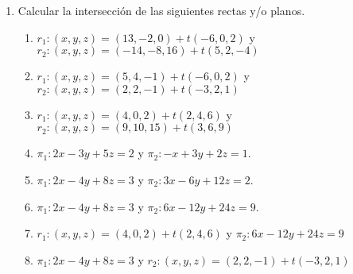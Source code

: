 \documentclass[a4paper]{article}
\newcommand{\exercise}{\item}
\begin{document}
\begin{enumerate}
\begin{enumerate} [label=(\alph*)]
		\item  Es paralelo al vector $(2,-1,4)$ y pasa por el punto $P(3,3,1)$.
		\item  Pasa por los puntos $P(4,0,5)$ y $Q(-1,-1,0)$.
		\item  Pasa por los puntos $A(0,1,1)$, $B(1,3,2)$, $C(0,2,-4)$ y $D(1,7,5)$.
		\item  Pasa por los puntos $P(3,-2,0)$ y $Q(1,-1,1)$ y es paralelo al vector $(1,2,2)$.
		\item  Pasa por los puntos $P(3,-2,0)$ y $Q(1,-1,1)$ y es paralelo al vector $(1,2,2)$.
		\item  Es paralelo al plano $\pi: 2x-3y+2z=6$ y pasa por el punto $P(2,1,0)$.
		\item  Es paralelo a las rectas $r_1: (x,y,z)=(1,4,0)+t(5,5,-3)$ y $r_2: (x,y,z)=(-10,2,7)+t(4,0,3)$ y contiene al punto $P(2,2,2)$.
		\item  Es perpendicular a la recta $r: (x,y,z)=(2,-9,7)+t(1,-1,1)$ y pasa por el punto $P(3,1,-3)$.
		\item  Contiene a la recta $r: (x,y,z)=(5,1,0)+t(1,-3,1)$.
		\item Es perpendicular a los planos $\pi_1: 2x-3y+5z=2$ y $\pi_2: -x+3y+2z=1$ e incluye al punto $P(5,1,0)$.
		\item Es perpendicular al planos $\pi: 3x-2y+z=5$ y pasa por $P(4,1,5)$.
		\item  Contiene a la recta $r: (x,y,z)=(2,1,2)+t(0,4,1)$ y al punto $P(1,2,3)$
		\item  Contiene a las rectas $r_1: (x,y,z)=(13,-2,0)+t(-6,0,2)$ y $r_2: (x,y,z)=(-14,-8,16)+t(5,2,-4)$.
	\end{enumerate}
	\exercise Calcular la intersección de las siguientes rectas y/o planos.
	\begin{enumerate} [label=(\alph*)]
		\item $r_1: (x,y,z)=(13,-2,0)+t(-6,0,2)$ y $r_2: (x,y,z)=(-14,-8,16)+t(5,2,-4)$
		\item $r_1: (x,y,z)=(5,4,-1)+t(-6,0,2)$ y $r_2: (x,y,z)=(2,2,-1)+t(-3,2,1)$
		\item $r_1: (x,y,z)=(4,0,2)+t(2,4,6)$ y $r_2: (x,y,z)=(9,10,15)+t(3,6,9)$
		\item $\pi_1: 2x-3y+5z=2$ y $\pi_2: -x+3y+2z=1$.
		\item $\pi_1: 2x-4y+8z=3$ y $\pi_2: 3x-6y+12z=2$.
		\item $\pi_1: 2x-4y+8z=3$ y $\pi_2: 6x-12y+24z=9$.
		\item $r_1: (x,y,z)=(4,0,2)+t(2,4,6)$ y $\pi_2: 6x-12y+24z=9$
		\item $\pi_1: 2x-4y+8z=3$ y $r_2: (x,y,z)=(2,2,-1)+t(-3,2,1)$
	\end{enumerate}
\end{enumerate}
\end{document}
